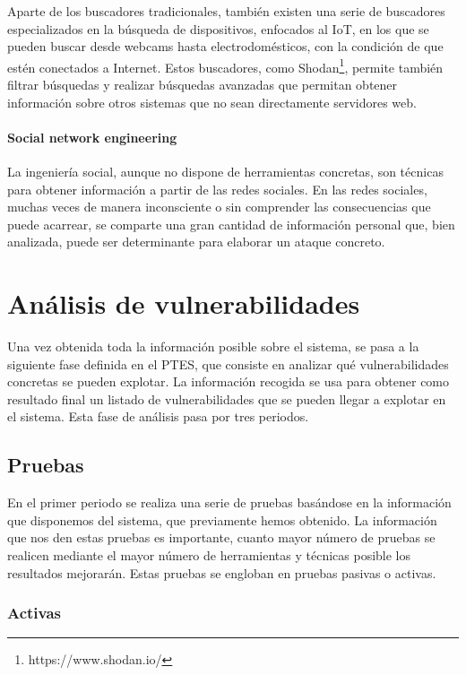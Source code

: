 Aparte de los buscadores tradicionales, también existen una serie de buscadores especializados en la búsqueda de dispositivos, enfocados al IoT, en los que se pueden buscar desde webcams hasta electrodomésticos, con la condición de que estén conectados a Internet. Estos buscadores, como Shodan\footnote{https://www.shodan.io/}, permite también filtrar búsquedas y realizar búsquedas avanzadas que permitan obtener información sobre otros sistemas que no sean directamente servidores web.

\paragraph{Social network engineering}

La ingeniería social, aunque no dispone de herramientas concretas, son técnicas para obtener información a partir de las redes sociales. En las redes sociales, muchas veces de manera inconsciente o sin comprender las consecuencias que puede acarrear, se comparte una gran cantidad de información personal que, bien analizada, puede ser determinante para elaborar un ataque concreto.

\section{Análisis de vulnerabilidades}

Una vez obtenida toda la información posible sobre el sistema, se pasa a la siguiente fase definida en el PTES, que consiste en analizar qué vulnerabilidades concretas se pueden explotar. La información recogida se usa para obtener como resultado final un listado de vulnerabilidades que se pueden llegar a explotar en el sistema. Esta fase de análisis pasa por tres periodos.

\subsection{Pruebas}

En el primer periodo se realiza una serie de pruebas basándose en la información que disponemos del sistema, que previamente hemos obtenido. La información que nos den estas pruebas es importante, cuanto mayor número de pruebas se realicen mediante el mayor número de herramientas y técnicas posible los resultados mejorarán. Estas pruebas se engloban en pruebas pasivas o activas.

\subsubsection{Activas}

